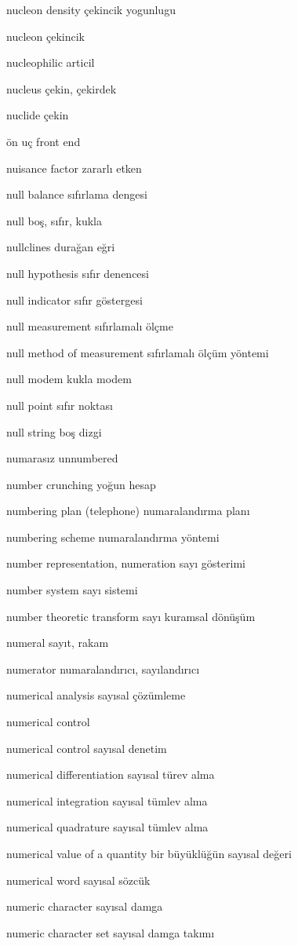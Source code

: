 \documentclass[12pt,fleqn]{article}\usepackage{../../common}
\begin{document}
nucleon density çekincik yogunlugu

nucleon çekincik

nucleophilic articil

nucleus çekin, çekirdek

nuclide çekin

ön uç front end

nuisance factor zararlı etken

null balance sıfırlama dengesi

null boş, sıfır, kukla

nullclines durağan eğri

null hypothesis sıfır denencesi

null indicator sıfır göstergesi

null measurement sıfırlamalı ölçme

null method of measurement sıfırlamalı ölçüm yöntemi

null modem kukla modem

null point sıfır noktası

null string boş dizgi

numarasız unnumbered

number crunching yoğun hesap

numbering plan (telephone) numaralandırma planı

numbering scheme numaralandırma yöntemi

number representation, numeration sayı gösterimi

number system sayı sistemi

number theoretic transform sayı kuramsal dönüşüm

numeral sayıt, rakam

numerator numaralandırıcı, sayılandırıcı

numerical analysis sayısal çözümleme

numerical control

numerical control sayısal denetim

numerical differentiation sayısal türev alma

numerical integration sayısal tümlev alma

numerical quadrature sayısal tümlev alma

numerical value of a quantity bir büyüklüğün sayısal değeri

numerical word sayısal sözcük

numeric character sayısal damga

numeric character set sayısal damga takımı
\end{document}
